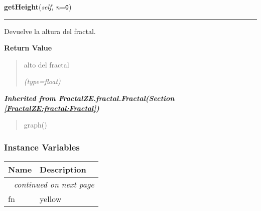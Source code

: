     \label{FractalZE:pascal:Pascal:getHeight}

    \vspace{0.5ex}

\hspace{.8\funcindent}\begin{boxedminipage}{\funcwidth}

    \raggedright \textbf{getHeight}(\textit{self}, \textit{n}={\tt 0})

    \vspace{-1.5ex}

    \rule{\textwidth}{0.5\fboxrule}
\setlength{\parskip}{2ex}
    Devuelve la altura del fractal.

\setlength{\parskip}{1ex}
      \textbf{Return Value}
    \vspace{-1ex}

      \begin{quote}
      alto del fractal

      {\it (type=float)}

      \end{quote}

    \end{boxedminipage}


\large{\textbf{\textit{Inherited from FractalZE.fractal.Fractal\textit{(Section \ref{FractalZE:fractal:Fractal})}}}}

\begin{quote}
graph()
\end{quote}


  \subsubsection{Instance Variables}

    \vspace{-1cm}
\hspace{\varindent}\begin{longtable}{|p{\varnamewidth}|p{\vardescrwidth}|l}
\cline{1-2}
\cline{1-2} \centering \textbf{Name} & \centering \textbf{Description}& \\
\cline{1-2}
\endhead\cline{1-2}\multicolumn{3}{r}{\small\textit{continued on next page}}\\\endfoot\cline{1-2}
\endlastfoot\raggedright f\-n\- & yellow&\\
\cline{1-2}
\end{longtable}

